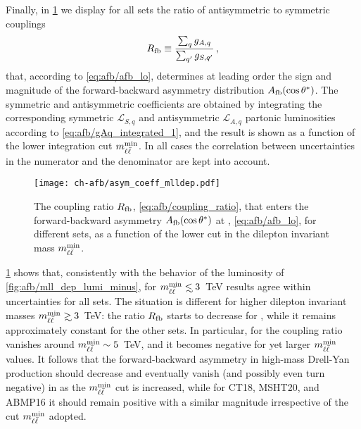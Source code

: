 Finally, in \cref{fig:afb/asym_coeff_mlldep} we display for all
\pdf sets the
ratio of antisymmetric to symmetric couplings
\begin{equation}
\label{eq:afb/coupling_ratio}
R_{\rm fb}\equiv \frac{\sum_q g_{A,q}}{\sum_{q'} g_{S,{q'}}} \, ,
\end{equation}
that, according to
\cref{eq:afb/afb_lo}, determines at leading order
the sign and magnitude
of the forward-backward asymmetry distribution $A_{\rm fb}(\cos\theta^*)$.
%
The symmetric and antisymmetric coefficients are obtained by integrating
the corresponding symmetric $\mathcal{L}_{S,q}$ and antisymmetric
$\mathcal{L}_{A,q}$ partonic luminosities according to
\cref{eq:afb/gAq_integrated_1}, and the result is shown as a function of the lower integration cut $m_{\ell\bar{\ell}}^{\rm min}$.
%
In all cases the correlation between \pdf uncertainties in the numerator and
the denominator are kept into account.

\begin{figure}[!t]
 \centering
 \texttt{[image: ch-afb/asym\_coeff\_mlldep.pdf]}
 \caption{The coupling ratio $R_{\rm fb}$,
   \cref{eq:afb/coupling_ratio},
   that enters the forward-backward asymmetry $A_{\rm
     fb}(\cos\theta^*)$ at \lo,  \cref{eq:afb/afb_lo}, for different \pdf
   sets, as  a function of the lower cut in the dilepton
   invariant mass $m_{\ell\bar{\ell}}^{\rm min}$.
 }    
 \label{fig:afb/asym_coeff_mlldep}
\end{figure}

\cref{fig:afb/asym_coeff_mlldep} shows that, consistently
with the behavior of the luminosity of
\cref{fig:afb/mll_dep_lumi_minus},  for $\mll^{{\rm
    min}}\lsim 3$~TeV results agree within uncertainties for all \pdf
sets.
%
The situation is different for higher dilepton invariant masses $\mll^{{\rm min}}\gsim 3$~TeV:
the ratio $R_{\rm fb}$ starts to decrease for , while it
remains approximately  constant 
for the other  \pdf sets. In particular, for  the coupling ratio
vanishes around $m_{\ell\bar{\ell}}^{{\rm min}}\sim5$~TeV, and it becomes negative
for yet larger   $m_{\ell\bar{\ell}}^{{\rm min}}$ values.
It follows that the forward-backward
asymmetry in high-mass Drell-Yan production should decrease  and
eventually vanish (and possibly even turn negative)
in  as the $m_{\ell\bar{\ell}}^{{\rm min}}$ cut is increased,
while for CT18, MSHT20, and ABMP16 it should remain positive
with a similar magnitude irrespective of the cut  $m_{\ell\bar{\ell}}^{{\rm min}}$ adopted.

